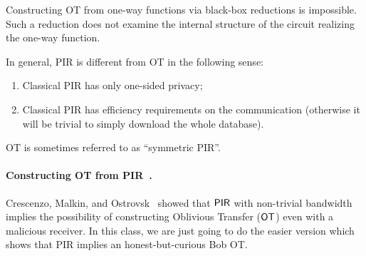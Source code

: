 \begin{theorem} \cite{IR89}
Constructing OT from one-way functions via black-box reductions is impossible. Such a reduction does not examine the internal structure of the circuit realizing the one-way function.
\end{theorem}


\begin{remark}
    In general, PIR is different from OT in the following sense:
    \begin{enumerate}
        \item Classical PIR has only one-sided privacy;
        \item Classical PIR has efficiency requirements on the communication (otherwise it will be trivial to simply download the whole database).
    \end{enumerate}
    OT is sometimes referred to as ``symmetric PIR''.
\end{remark}



\paragraph{Constructing OT from PIR~\cite{CMO00}.}
Crescenzo, Malkin, and  Ostrovsk~\cite{CMO00} showed that ${\sf PIR}$ with non-trivial bandwidth implies the possibility of constructing Oblivious Transfer (${\sf OT}$) even with a malicious receiver.
In this class, we are just going to do the easier version which shows that PIR implies an honest-but-curious Bob OT. 

